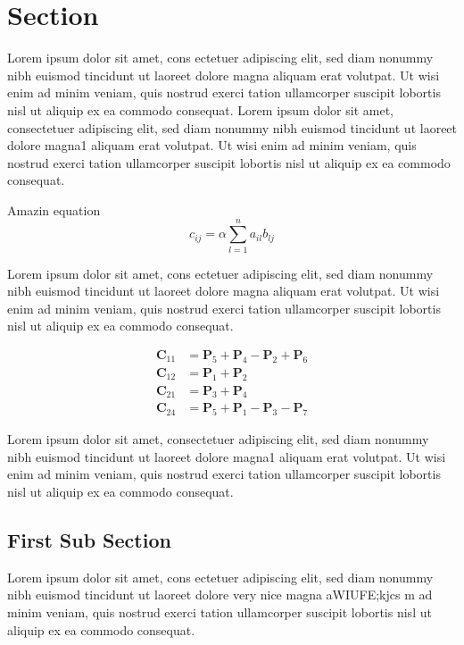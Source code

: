 \section{Section}

Lorem ipsum dolor sit amet, cons ectetuer adipiscing elit, sed diam nonummy nibh euismod tincidunt ut laoreet dolore magna aliquam erat volutpat. Ut wisi enim ad minim veniam, quis nostrud exerci tation ullamcorper suscipit lobortis nisl ut aliquip ex ea commodo consequat.
Lorem ipsum dolor sit amet, consectetuer adipiscing elit, sed diam nonummy nibh euismod tincidunt ut laoreet dolore magna1 aliquam erat volutpat. Ut wisi enim ad minim veniam, quis nostrud exerci tation ullamcorper suscipit lobortis nisl ut aliquip ex ea commodo consequat. 

Amazin equation
\begin{equation}
    c_{ij} = \alpha\sum_{l=1}^n a_{il}b_{lj}
    \label{eq: naive matrix mult}
\end{equation}


Lorem ipsum dolor sit amet, cons ectetuer adipiscing elit, sed diam nonummy nibh euismod tincidunt ut laoreet dolore magna aliquam erat volutpat. Ut wisi enim ad minim veniam, quis nostrud exerci tation ullamcorper suscipit lobortis nisl ut aliquip ex ea commodo consequat.

\begin{align*}
    \textbf{C}_{11} &= \textbf{P}_5 + \textbf{P}_4-\textbf{P}_2+\textbf{P}_6\\
    \textbf{C}_{12} &= \textbf{P}_1 + \textbf{P}_2 \\
    \textbf{C}_{21} &= \textbf{P}_3 + \textbf{P}_4 \\
    \textbf{C}_{24} &= \textbf{P}_5 + \textbf{P}_1 - \textbf{P}_3 - \textbf{P}_7
\end{align*}

Lorem ipsum dolor sit amet, consectetuer adipiscing elit, sed diam nonummy nibh euismod tincidunt ut laoreet dolore magna1 aliquam erat volutpat. Ut wisi enim ad minim veniam, quis nostrud exerci tation ullamcorper suscipit lobortis nisl ut aliquip ex ea commodo consequat. 

\subsection{ First Sub Section}

Lorem ipsum dolor sit amet, cons ectetuer adipiscing elit, sed diam nonummy nibh euismod tincidunt ut laoreet dolore very nice magna aWIUFE;kjcs m ad minim veniam, quis nostrud exerci tation ullamcorper suscipit lobortis nisl ut aliquip ex ea commodo consequat.

